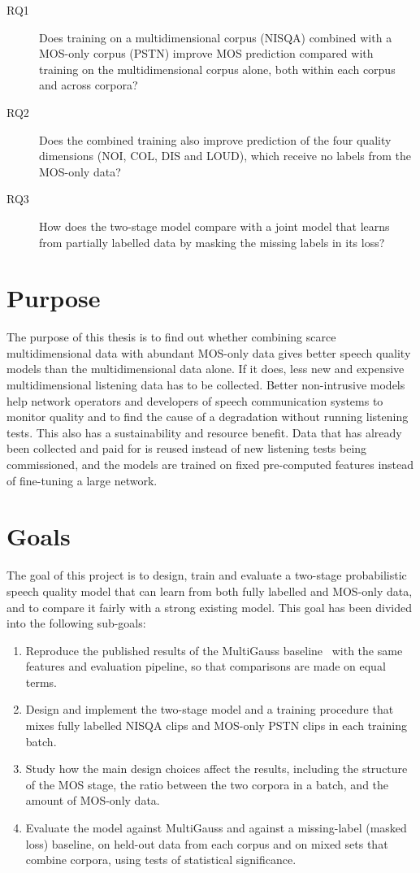 \documentclass[
english,                 %
bibtex,                  %
includeExtraAbstracts, %
]{kththesis}
\numberwithin{listing}{chapter}
\begin{document}
\begin{description}
\item[RQ1] Does training on a multidimensional corpus (NISQA) combined with a MOS-only corpus (PSTN) improve MOS prediction compared with training on the multidimensional corpus alone, both within each corpus and across corpora?
\item[RQ2] Does the combined training also improve prediction of the four quality dimensions (NOI, COL, DIS and LOUD), which receive no labels from the MOS-only data?
\item[RQ3] How does the two-stage model compare with a joint model that learns from partially labelled data by masking the missing labels in its loss?
\end{description}

\section{Purpose}

The purpose of this thesis is to find out whether combining scarce multidimensional data with abundant MOS-only data gives better speech quality models than the multidimensional data alone. If it does, less new and expensive multidimensional listening data has to be collected. Better non-intrusive models help network operators and developers of speech communication systems to monitor quality and to find the cause of a degradation without running listening tests. This also has a sustainability and resource benefit. Data that has already been collected and paid for is reused instead of new listening tests being commissioned, and the models are trained on fixed pre-computed features instead of fine-tuning a large network.

\section{Goals}
\label{sec:goals}

The goal of this project is to design, train and evaluate a two-stage probabilistic speech quality model that can learn from both fully labelled and MOS-only data, and to compare it fairly with a strong existing model. This goal has been divided into the following sub-goals:
\begin{enumerate}
\item Reproduce the published results of the MultiGauss baseline~\cite{cumlin_multigauss_2025} with the same features and evaluation pipeline, so that comparisons are made on equal terms.
\item Design and implement the two-stage model and a training procedure that mixes fully labelled NISQA clips and MOS-only PSTN clips in each training batch.
\item Study how the main design choices affect the results, including the structure of the MOS stage, the ratio between the two corpora in a batch, and the amount of MOS-only data.
\item Evaluate the model against MultiGauss and against a missing-label (masked loss) baseline, on held-out data from each corpus and on mixed sets that combine corpora, using tests of statistical significance.
\end{enumerate}
\end{document}
